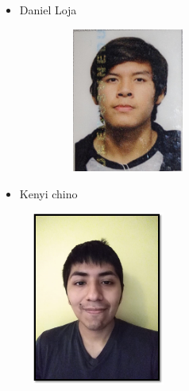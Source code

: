 \documentclass[12pt]{article}
\begin{document}
\begin{multicols}{2}
\begin{itemize}
\vspace{\baselineskip}

\vspace{\baselineskip}
	\item {\fontsize{9pt}{10.8pt}\selectfont Daniel Loja\par}\par




\begin{figure}[H]		\includegraphics[width=2.01in,height=1.86in]{./media/image3.png}
\end{figure}



\par

	\item {\fontsize{9pt}{10.8pt}\selectfont Kenyi chino\par}
\end{itemize}\par




\begin{figure}[H]		\includegraphics[width=1.72in,height=2.25in]{./media/image4.png}
\end{figure}



\end{multicols}
\end{document}
